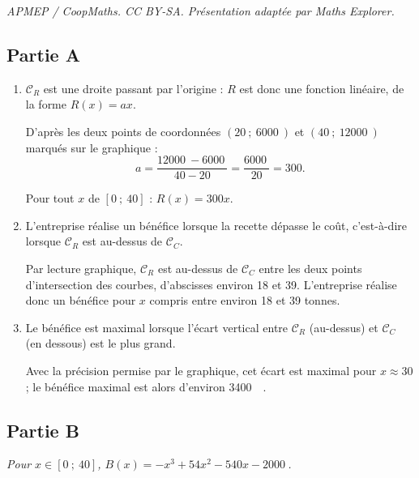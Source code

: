 \documentclass[10pt]{article}
\providecommand{\euro}{\texteuro}
\providecommand{\np}[2][]{{#2~#1}}
\providecommand{\euro}{{\text{€}}}
\renewcommand{\euro}{\ifmmode\text{\texteuro}\else\texteuro\fi}
\begin{document}
\noindent\textit{APMEP / CoopMaths. CC BY-SA. Présentation adaptée par Maths Explorer.}\par\medskip
\subsection*{Partie A}

\begin{enumerate}
	\item $\mathcal{C}_R$ est une droite passant par l'origine : $R$ est donc une fonction linéaire, de la forme $R(x) = ax$.

	D'après les deux points de coordonnées $(20~;~\np{6000})$ et $(40~;~\np{12000})$ marqués sur le graphique :
	\[a = \dfrac{\np{12000} - \np{6000}}{40 - 20} = \dfrac{\np{6000}}{20} = 300.\]
	
Pour tout $x$ de $[0~;~40]$ : $R(x) = 300x$.

	\item L'entreprise réalise un bénéfice lorsque la recette dépasse le coût, c'est-à-dire lorsque
	$\mathcal{C}_R$ est au-dessus de $\mathcal{C}_C$.

	Par lecture graphique, $\mathcal{C}_R$ est au-dessus de $\mathcal{C}_C$ entre les deux
	points d'intersection des courbes, d'abscisses environ 18 et 39.
	L'entreprise réalise donc un bénéfice pour $x$ compris entre environ
	18 et 39 tonnes.

	\item Le bénéfice est maximal lorsque l'écart vertical
	entre $\mathcal{C}_R$ (au-dessus) et $\mathcal{C}_C$ (en dessous) est le plus grand.

	Avec la précision permise par le graphique, cet écart est maximal pour
	$x \approx 30$ ; le bénéfice maximal est alors d'environ \np{3400}~\euro.
\end{enumerate}

\subsection*{Partie B}

\emph{Pour $x \in [0~;~40]$, $B(x) = -x^3+54x^2-540x-\np{2000}$.}
\end{document}
